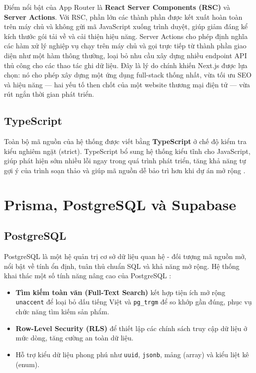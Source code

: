 Điểm nổi bật của App Router là \textbf{React Server Components (RSC)} và \textbf{Server
Actions}. Với RSC, phần lớn các thành phần được kết xuất hoàn toàn trên máy chủ và không gửi
mã JavaScript xuống trình duyệt, giúp giảm đáng kể kích thước gói tải về và cải thiện hiệu năng.
Server Actions cho phép định nghĩa các hàm xử lý nghiệp vụ chạy trên máy chủ và gọi trực tiếp
từ thành phần giao diện như một hàm thông thường, loại bỏ nhu cầu xây dựng nhiều endpoint API
thủ công cho các thao tác ghi dữ liệu. Đây là lý do chính khiến Next.js được lựa chọn: nó cho phép
xây dựng một ứng dụng full-stack thống nhất, vừa tối ưu SEO và hiệu năng --- hai yếu tố then chốt
của một website thương mại điện tử --- vừa rút ngắn thời gian phát triển.

\subsection{TypeScript}

Toàn bộ mã nguồn của hệ thống được viết bằng \textbf{TypeScript} ở chế độ kiểm tra kiểu nghiêm
ngặt (strict). TypeScript bổ sung hệ thống kiểu tĩnh cho JavaScript, giúp phát hiện sớm nhiều lỗi
ngay trong quá trình phát triển, tăng khả năng tự gợi ý của trình soạn thảo và giúp mã nguồn dễ
bảo trì hơn khi dự án mở rộng \cite{typescript}.

\section{Prisma, PostgreSQL và Supabase}

\subsection{PostgreSQL}

PostgreSQL là một hệ quản trị cơ sở dữ liệu quan hệ - đối tượng mã nguồn mở, nổi bật về tính ổn
định, tuân thủ chuẩn SQL và khả năng mở rộng. Hệ thống \brandName{} khai thác một số tính năng
nâng cao của PostgreSQL \cite{postgresql}:

\begin{itemize}
  \item \textbf{Tìm kiếm toàn văn (Full-Text Search)} kết hợp tiện ích mở rộng \texttt{unaccent}
  để loại bỏ dấu tiếng Việt và \texttt{pg\_trgm} để so khớp gần đúng, phục vụ chức năng tìm kiếm
  sản phẩm.
  \item \textbf{Row-Level Security (RLS)} để thiết lập các chính sách truy cập dữ liệu ở mức dòng,
  tăng cường an toàn dữ liệu.
  \item Hỗ trợ kiểu dữ liệu phong phú như \texttt{uuid}, \texttt{jsonb}, mảng (array) và kiểu liệt
  kê (enum).
\end{itemize}

